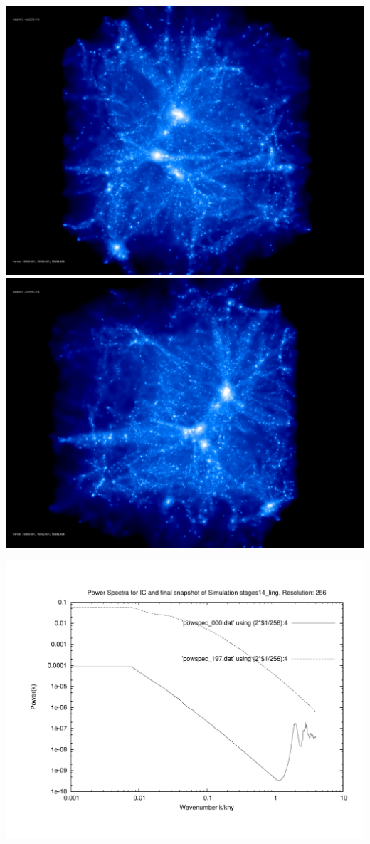 \includegraphics[scale=0.1]{r256/h100/stages14_ling/rotate_00074.jpg} 
\includegraphics[scale=0.1]{r256/h100/stages14_ling/rotate_00131.jpg}

\includegraphics[scale=0.5]{r256/h100/stages14_ling/plot_powspec_stages14_ling}

